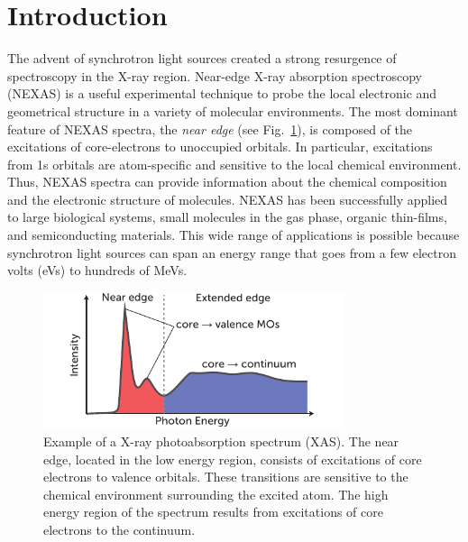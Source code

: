 \documentclass[12pt]{article}
\begin{document}
\section{Introduction}
The advent of synchrotron light sources created a strong resurgence of spectroscopy in the X-ray region. \cite{mcmillan_synchrotronproposed_1945} Near-edge X-ray absorption spectroscopy (NEXAS) is a useful experimental technique to probe the local electronic and geometrical structure in a variety of molecular environments.
The most dominant feature of NEXAS spectra, the \textit{near edge}  (see Fig.~\ref{fig:nexas-illustration}), is composed of the excitations of core-electrons to unoccupied orbitals.
In particular, excitations from 1s orbitals are atom-specific and sensitive to the local chemical environment.
Thus, NEXAS spectra can provide information about the chemical composition and the electronic structure of molecules.
NEXAS has been successfully applied to large biological systems, \cite{hua_refinement_2010} small molecules in the gas phase,\cite{contini_gas-phase_2001} organic thin-films,\cite{hahner_near_2006} and semiconducting materials.\cite{guo_electronic_2011} This wide range of applications is possible because synchrotron light sources can span an energy range that goes from a few electron volts (eVs) \cite{feneberg_synchrotron-based_2011} to hundreds of MeVs.\cite{nakazato_observation_1989}

\begin{figure}[!b]
\centering
\includegraphics[width=8.8cm]{NEXASIllustration.pdf}
\caption{Example of a X-ray photoabsorption spectrum (XAS).  The near edge, located in the low energy region, consists of excitations of core electrons to valence orbitals.  These transitions are sensitive to the chemical environment surrounding the excited atom.  The high energy region of the spectrum results from excitations of core electrons to the continuum.}
\label{fig:nexas-illustration}
\end{figure}
\end{document}
